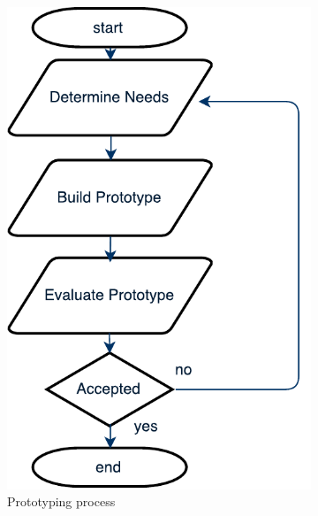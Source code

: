 \documentclass{l4proj}
\begin{document}
\begin{figure}[H]
	\begin{subfigure}{.33\textwidth}
		\centering
		\includegraphics[width=\textwidth]{images/uiPrototyping}
		\caption{Prototyping process}
		\label{uiPrototyping}
	\end{subfigure}
	\begin{subfigure}{.33\textwidth}
		\centering

\end{subfigure}
\end{figure}
\end{document}
